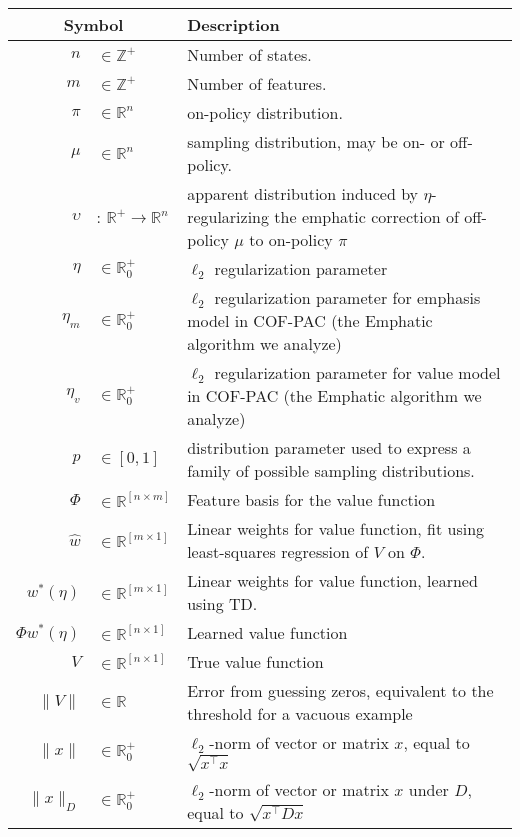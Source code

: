 \begin{tabular}{rl p{4in}}\hline\hline
  \multicolumn{2}{c}{Symbol} & Description
  \\\hline
  $n$                        & $\in\mathbb Z^+$ & Number of states.
  \\  $m$ & $\in\mathbb Z^+$ & Number of features.
  \\  $\pi$ & $\in\mathbb R^{n}$ & on-policy distribution.
  \\  $\mu$ & $\in\mathbb R^{n}$ & sampling distribution, may be on- or off-policy.
  \\  $\upsilon$ & : $\mathbb R^+ \to \mathbb R^{n}$ & apparent distribution induced by $\eta$-regularizing the emphatic correction of off-policy $\mu$ to on-policy $\pi$
  \\  $\eta$ & $\in \mathbb R^+_0$ & $\ell_2$ regularization parameter
  \\  $\eta_m$ & $\in \mathbb R^+_0$ & $\ell_2$ regularization parameter for emphasis model in COF-PAC (the Emphatic algorithm we analyze)
  \\  $\eta_v$ & $\in \mathbb R^+_0$ & $\ell_2$ regularization parameter for value model in COF-PAC (the Emphatic algorithm we analyze)
  \\  $p$ & $\in[0, 1]$ & distribution parameter used to express a family of possible sampling distributions.
  \\  $\Phi$ & $\in \mathbb R^{[n\times m]}$ & Feature basis for the value function
  \\  $\hat w$ & $\in \mathbb R^{[m\times 1]}$ & Linear weights for value function, fit using least-squares regression of $V$ on $\Phi$.
  \\  $w^*(\eta)$ & $\in \mathbb R^{[m\times 1]}$ & Linear weights for value function, learned using TD.
  \\  $\Phi w^*(\eta)$ & $\in \mathbb R^{[n\times 1]}$ & Learned value function
  \\  $V$ & $\in \mathbb R^{[n\times 1]}$ & True value function
  \\  $\|V\|$ & $\in \mathbb R$ & Error from guessing zeros, equivalent to the threshold for a vacuous example
  \\  $\|x\|$ & $\in\mathbb R^+_0$ & $\ell_2$-norm of vector or matrix $x$, equal to $\sqrt{x^\top x}$
  \\  $\|x\|_D$ & $\in\mathbb R^+_0$ & $\ell_2$-norm of vector or matrix $x$ under $D$, equal to $\sqrt{x^\top D x}$
  \\ \hline\hline
\end{tabular}


